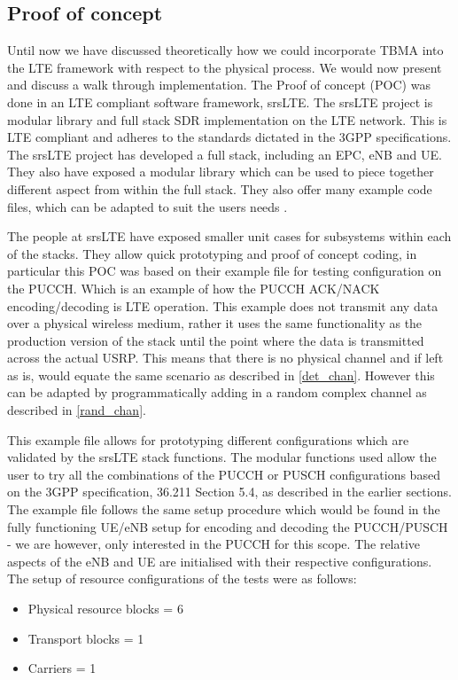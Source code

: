 \documentclass{article}
\begin{document}
\subsection{Proof of concept}\label{srslte_poc}
Until now we have discussed theoretically how we could incorporate TBMA into the LTE framework with respect to the physical process. We would now present and discuss a walk through implementation. The Proof of concept (POC) was done in an LTE compliant software framework, srsLTE. The srsLTE project is modular library and full stack SDR implementation on the LTE network. This is LTE compliant and adheres to the standards dictated in the 3GPP specifications. The srsLTE project has developed a full stack, including an \ac{EPC}, \ac{eNB} and \ac{UE}. They also have exposed a modular library which can be used to piece together different aspect from within the full stack. They also offer many example code files, which can be adapted to suit the users needs \cite{srsLTE}. 

The people at srsLTE have exposed smaller unit cases for subsystems within each of the stacks. They allow quick prototyping and proof of concept coding, in particular this POC was based on their example file for testing configuration on the PUCCH. Which is an example of how the PUCCH ACK/NACK encoding/decoding is LTE operation. This example does not transmit any data over a physical wireless medium, rather it uses the same functionality as the production version of the stack until the point where the data is transmitted across the actual USRP. This means that there is no physical channel and if left as is, would equate the same scenario as described in \cref{det_chan}. However this can be adapted by programmatically adding in a random complex channel as described in \cref{rand_chan}.

This example file allows for prototyping different configurations which are validated by the srsLTE stack functions. The modular functions used allow the user to try all the combinations of the PUCCH or PUSCH configurations based on the 3GPP specification, 36.211 Section 5.4, as described in the earlier sections. The example file follows the same setup procedure which would be found in the fully functioning UE/eNB setup for encoding and decoding the PUCCH/PUSCH - we are however, only interested in the PUCCH for this scope. The relative aspects of the eNB and UE are initialised with their respective configurations. The setup of resource configurations of the tests were as follows:

\begin{itemize}
    \item Physical resource blocks = 6
    \item Transport blocks = 1
    \item Carriers = 1
\end{itemize}
\end{document}
